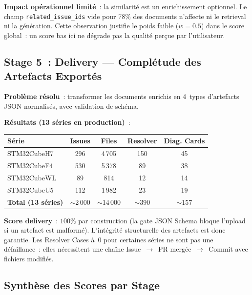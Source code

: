 \textbf{Impact opérationnel limité}~: la similarité est un enrichissement optionnel. Le champ \texttt{related\_issue\_ids} vide pour 78\% des documents n'affecte ni le retrieval ni la génération. Cette observation justifie le poids faible ($w=0.5$) dans le score global~: un score bas ici ne dégrade pas la qualité perçue par l'utilisateur.

\subsection{Stage 5~: Delivery --- Complétude des Artefacts Exportés}
\label{sec:eval_stage5}

\textbf{Problème résolu}~: transformer les documents enrichis en 4~types d'artefacts JSON normalisés, avec validation de schéma.

\textbf{Résultats (13 séries en production)}~:

\begin{longtable}{lcccc}
\toprule
\textbf{Série} & \textbf{Issues} & \textbf{Files} & \textbf{Resolver} & \textbf{Diag. Cards} \\
\midrule
STM32CubeH7 & 296 & 4\,705 & 150 & 45 \\
STM32CubeF4 & 530 & 5\,378 & 89 & 38 \\
STM32CubeWL & 89 & 814 & 12 & 14 \\
STM32CubeU5 & 112 & 1\,982 & 23 & 19 \\
\midrule
\textbf{Total (13 séries)} & $\sim$2\,000 & $\sim$14\,000 & $\sim$390 & $\sim$157 \\
\bottomrule
\end{longtable}

\textbf{Score delivery}~: $100\%$ par construction (la gate JSON Schema bloque l'upload si un artefact est malformé). L'intégrité structurelle des artefacts est donc garantie. Les Resolver Cases à~0 pour certaines séries ne sont pas une défaillance~: elles nécessitent une chaîne Issue~$\to$~PR mergée~$\to$~Commit avec fichiers modifiés.

\subsection{Synthèse des Scores par Stage}
\label{sec:synthese_stages}

